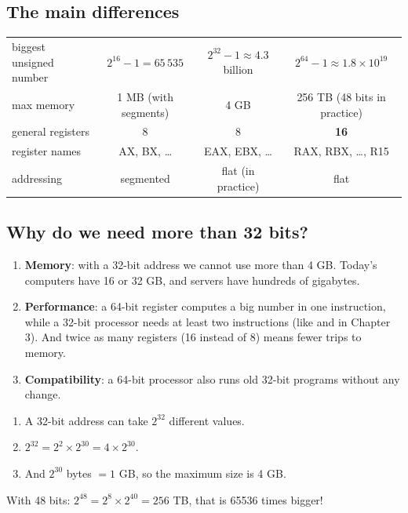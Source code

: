 \subsection{The main differences}
\begin{center}
\small
\begin{tabularx}{\linewidth}{|>{\centering\arraybackslash}p{3.2cm}|C|C|C|}
    \hline
    \ras{} &  &  &  \\ \hline
    biggest unsigned number & $2^{16}-1 = 65\,535$ & $2^{32}-1 \approx 4.3$ billion & $2^{64}-1 \approx 1.8 \times 10^{19}$ \\ \hline
    max memory & 1 MB (with segments) & 4 GB & 256 TB (48 bits in practice) \\ \hline
    general registers & 8 & 8 & \textbf{16} \\ \hline
    register names & AX, BX, \dots & EAX, EBX, \dots & RAX, RBX, \dots, R15 \\ \hline
    addressing & segmented & flat (in practice) & flat \\ \hline
\end{tabularx}
\end{center}

\subsection{Why do we need more than 32 bits?}
\begin{enumerate}
    \item \textbf{Memory}: with a 32-bit address we cannot use more than 4 GB. Today's computers have 16 or 32 GB,
          and servers have hundreds of gigabytes.
    \item \textbf{Performance}: a 64-bit register computes a big number in one instruction, while a 32-bit processor needs
          at least two instructions (like  and  in Chapter 3). And twice as many registers (16 instead of 8)
          means fewer trips to memory.
    \item \textbf{Compatibility}: a 64-bit processor also runs old 32-bit programs without any change.
\end{enumerate}

\begin{khatwa}
    \begin{enumerate}
        \item A 32-bit address can take $2^{32}$ different values.
        \item $2^{32} = 2^{2} \times 2^{30} = 4 \times 2^{30}$.
        \item And $2^{30}$ bytes $= 1$ GB, so the maximum size is 4 GB.
    \end{enumerate}
    With 48 bits: $2^{48} = 2^{8} \times 2^{40} = 256$ TB, that is 65536 times bigger!
\end{khatwa}

